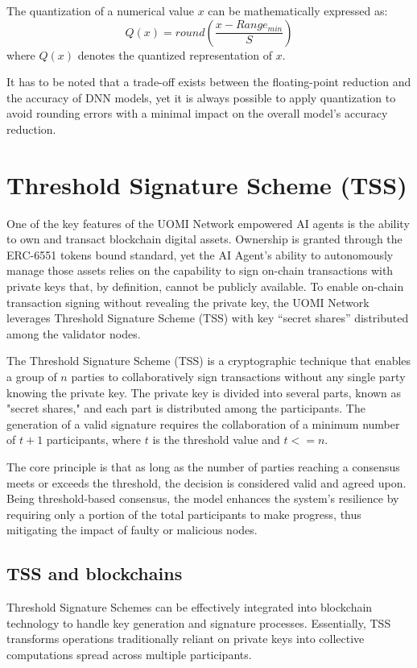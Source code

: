 \documentclass{article}
\begin{document}
The quantization of a numerical value \( x \) can be mathematically expressed as:
\[
Q(x) = round\left(\frac{x - Range_{min}}{S}\right)
\]
where \( Q(x) \) denotes the quantized representation of \( x \).

It has to be noted that a trade-off exists between the floating-point reduction and the accuracy of DNN models, yet it is always possible to apply quantization to avoid rounding errors with a minimal impact on the overall model’s accuracy reduction. 


\section{Threshold Signature Scheme (TSS)}

    
One of the key features of the UOMI Network empowered AI agents is the ability to own and transact blockchain digital assets. Ownership is granted through the ERC-6551 tokens bound standard, yet the AI Agent’s ability to autonomously manage those assets relies on the capability to sign on-chain transactions with private keys that, by definition, cannot be publicly available. To enable on-chain transaction signing without revealing the private key, the UOMI Network leverages Threshold Signature Scheme (TSS) with key “secret shares” distributed among the validator nodes. 

The Threshold Signature Scheme (TSS) is a cryptographic technique that enables a group of \(n\) parties to collaboratively sign transactions without any single party knowing the private key. The private key is divided into several parts, known as "secret shares," and each part is distributed among the participants. The generation of a valid signature requires the collaboration of a minimum number of \(t+1\)  participants, where \(t\) is the threshold value and \(t<=n\). 

The core principle is that as long as the number of parties reaching a consensus meets or exceeds the threshold, the decision is considered valid and agreed upon. Being threshold-based consensus, the model enhances the system's resilience by requiring only a portion of the total participants to make progress, thus mitigating the impact of faulty or malicious nodes.

\subsection{TSS and blockchains}
Threshold Signature Schemes can be effectively integrated into blockchain technology to handle key generation and signature processes. Essentially, TSS transforms operations traditionally reliant on private keys into collective computations spread across multiple participants.
\end{document}
